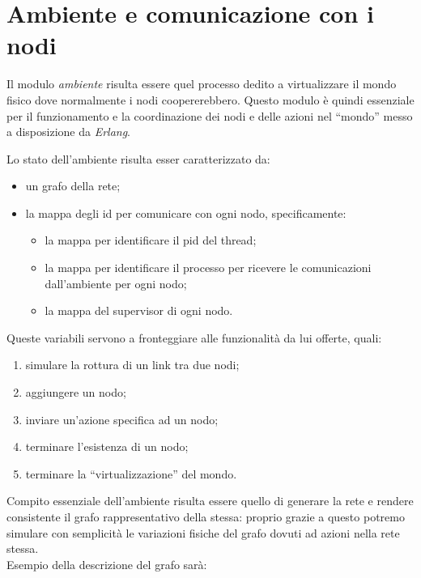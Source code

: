 \documentclass[italian]{memoir}
\begin{document}
\section{Ambiente e comunicazione con i nodi}
Il modulo \textit{ambiente} risulta essere quel processo dedito a virtualizzare il mondo fisico dove normalmente i nodi coopererebbero. Questo modulo è quindi essenziale per il funzionamento e la coordinazione dei nodi e delle azioni nel ``mondo'' messo a disposizione da \textit{Erlang}.

Lo stato dell'ambiente risulta esser caratterizzato da:
\begin{itemize}
    \item un grafo della rete;
    \item la mappa degli id per comunicare con ogni nodo, specificamente:
    \begin{itemize}
        \item la mappa per identificare il pid del thread;
        \item la mappa per identificare il processo per ricevere le comunicazioni dall'ambiente per ogni nodo;
        \item la mappa del supervisor di ogni nodo.
    \end{itemize}
\end{itemize}
Queste variabili servono a fronteggiare alle funzionalità da lui offerte, quali:
\begin{enumerate}
    \item simulare la rottura di un link tra due nodi;
    \item aggiungere un nodo;
    \item inviare un'azione specifica ad un nodo;
    \item terminare l'esistenza di un nodo;
    \item terminare la ``virtualizzazione'' del mondo.
\end{enumerate}
Compito essenziale dell'ambiente risulta essere quello di generare la rete e rendere consistente il grafo rappresentativo della stessa: proprio grazie a questo potremo simulare con semplicità le variazioni fisiche del grafo dovuti ad azioni nella rete stessa.\\
Esempio della descrizione del grafo sarà:
\end{document}
